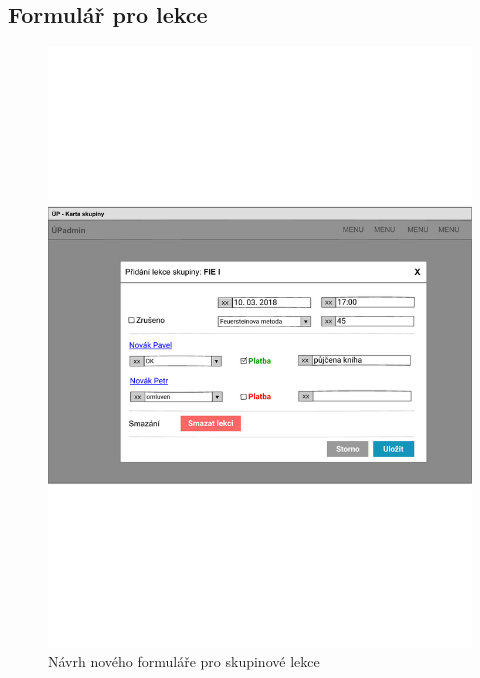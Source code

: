 \subsection{Formulář pro lekce}

\begin{figure}\centering
    \includegraphics[width=1\textwidth]{img/ui-lekce-skupina}
    \caption{Návrh nového formuláře pro skupinové lekce}\label{fig:ui-lekce-skupina}
\end{figure}

